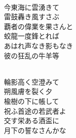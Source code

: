 \documentclass[10pt,b5j]{tarticle} %
\begin{document}
\begin{enumerate}
\begin{minipage}[c]{\blocksize}
    \end{minipage}
    \begin{minipage}[c]{\blocksize}
        
        \vspace{\linespace}
        \item~\\
        今東海に雲湧きて\\
        雷鼓轟き風すさぶ\\
        覇者の偉業を果さんと\\
        蛟龍一度鋒とれば\\
        あはれ声なき影もなき\\
        彼の狂乱の牛羊等
        
    \end{minipage}
    \begin{minipage}[c]{\blocksize}
        
        \vspace{\linespace}
        \item~\\
        輪影高く空澄みて\\
        朔風膚を裂く夕\\
        楡樹の下に帳して\\
        祝ふ首途の若武者よ\\
        交す栄ある酒盃に\\
        月下の誓なさんかな
    
    \end{minipage}
\end{enumerate} %
\end{document}
